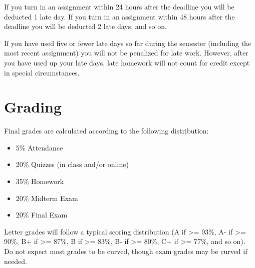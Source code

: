 \documentclass[10pt]{memoir}
\begin{document}
If you turn in an assignment within 24 hours after the deadline you will be deducted 1 late day. If you turn in an assignment within 48 hours after the deadline you will be deducted 2 late days, and so on. 

If you have used five or fewer late days so far during the semester (including the most recent assignment) you will not be penalized for late work. However, after you have used up your late days, late homework will not count for credit except in special circumstances.

\section{Grading}

Final grades are calculated according to the following distribution:
\begin{itemize}
\item 5\% Attendance
\item 20\% Quizzes (in class and/or online)
\item 35\% Homework
\item 20\% Midterm Exam
\item 20\% Final Exam
\end{itemize}

Letter grades will follow a typical scoring distribution (A if >= 93\%, A- if >= 90\%, B+ if >=
87\%, B if >= 83\%, B- if >= 80\%, C+ if >= 77\%, and so on). Do not expect most grades to be
curved, though exam grades may be curved if needed.


\end{document}
